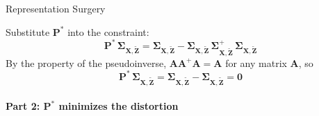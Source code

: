 \begin{question}{Representation Surgery}
\begin{subquestion}
Substitute $\mathbf{P}^\ast$ into the constraint:
\begin{equation}
    \mathbf{P}^\ast\, \boldsymbol{\Sigma}_{\mathbf{X}, \widetilde{\mathbf{Z}}} = \boldsymbol{\Sigma}_{\mathbf{X}, \widetilde{\mathbf{Z}}} - \boldsymbol{\Sigma}_{\mathbf{X}, \widetilde{\mathbf{Z}}}\, \boldsymbol{\Sigma}_{\mathbf{X}, \widetilde{\mathbf{Z}}}^+\, \boldsymbol{\Sigma}_{\mathbf{X}, \widetilde{\mathbf{Z}}}
\end{equation}
By the property of the pseudoinverse, $\mathbf{A}\mathbf{A}^+\mathbf{A} = \mathbf{A}$ for any matrix $\mathbf{A}$, so
\begin{equation}
    \mathbf{P}^\ast\, \boldsymbol{\Sigma}_{\mathbf{X}, \widetilde{\mathbf{Z}}} = \boldsymbol{\Sigma}_{\mathbf{X}, \widetilde{\mathbf{Z}}} - \boldsymbol{\Sigma}_{\mathbf{X}, \widetilde{\mathbf{Z}}} = \mathbf{0}
\end{equation}

\paragraph{Part 2: $\mathbf{P}^\ast$ minimizes the distortion}


\end{subquestion}
\end{question}

